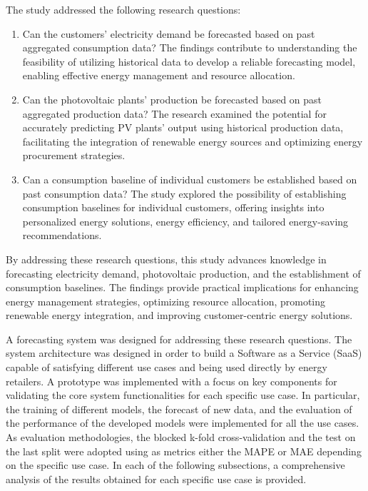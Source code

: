 The study addressed the following research questions:
\begin{enumerate}
  \item Can the customers' electricity demand be forecasted based on past aggregated consumption data? The findings contribute to understanding the feasibility of utilizing historical data to develop a reliable forecasting model, enabling effective energy management and resource allocation.
  \item Can the photovoltaic plants' production be forecasted based on past aggregated production data? The research examined the potential for accurately predicting PV plants' output using historical production data, facilitating the integration of renewable energy sources and optimizing energy procurement strategies.
  \item Can a consumption baseline of individual customers be established based on past consumption data? The study explored the possibility of establishing consumption baselines for individual customers, offering insights into personalized energy solutions, energy efficiency, and tailored energy-saving recommendations.
\end{enumerate}
By addressing these research questions, this study advances knowledge in forecasting electricity demand, photovoltaic production, and the establishment of consumption baselines. The findings provide practical implications for enhancing energy management strategies, optimizing resource allocation, promoting renewable energy integration, and improving customer-centric energy solutions.

A forecasting system was designed for addressing these research questions.
The system architecture was designed in order to build a Software as a Service (SaaS) capable of satisfying different use cases and being used directly by energy retailers.
A prototype was implemented with a focus on key components for validating the core system functionalities for each specific use case.
In particular, the training of different models, the forecast of new data, and the evaluation of the performance of the developed models were implemented for all the use cases.
As evaluation methodologies, the blocked k-fold cross-validation and the test on the last split were adopted using as metrics either the MAPE or MAE depending on the specific use case.
In each of the following subsections, a comprehensive analysis of the results obtained for each specific use case is provided.


\vspace{0.1 cm}
